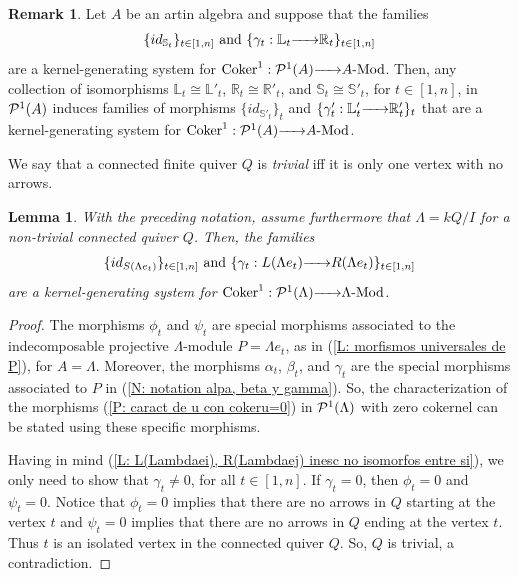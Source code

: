 \documentclass{article}
\newtheorem{lemma}[theorem]{Lemma}
\theoremstyle{definition}
\newtheorem{remark}[theorem]{Remark}
\newcommand{\Coker}{{ \rm Coker }}
\newcommand{\Mod}{{ \rm Mod }}
\newcommand{\g}{\hbox{-}}
\newcommand{\hueca}[1]{\mathbb{#1}}
\newcommand{\rightmap}[1]{\smash{\mathop{\hbox to 
20pt{\rightarrowfill}}\limits^{#1}}}
\begin{document}
\begin{remark}\label{R: isomorfos a generadores son generadores} 
Let $A$ be an artin algebra and 
suppose that  the families  
$$
\{id_{\hueca{S}_t}\}_{t\in [1,n]} \hbox{ and } 
\{\gamma_t:\hueca{L}_t\rightmap{}\hueca{R}_t\}_{t\in [1,n]}$$
  are a kernel-generating system for $\Coker^1:{\cal P}^1(A)\rightmap{}A\g\Mod$. 
 Then, any collection of isomorphisms  
$\hueca{L}_t\cong \hueca{L}'_t$, 
$\hueca{R}_t\cong \hueca{R}'_t$, and 
$\hueca{S}_t\cong \hueca{S}'_t$, for $t\in [1,n]$, in ${\cal P}^1(A)$ induces  families of  morphisms 
$\{id_{\hueca{S}'_t}\}_t$ and $\{\gamma'_t:\hueca{L}'_t\rightmap{}\hueca{R}'_t\}_t$ that are a kernel-generating system for  $\Coker^1:{\cal P}^1(A)\rightmap{}A\g\Mod$. 
\end{remark}

We say that a connected finite quiver $Q$ is \emph{trivial} iff it is only one vertex with no arrows. 

\begin{lemma}\label{R: vale Prop para las gammas(t)}  With the preceding notation, assume furthermore that $\Lambda=kQ/I$ for a  non-trivial connected quiver $Q$. Then, the families 
$$
\{id_{S(\Lambda e_t)}\}_{t\in [1,n]} \hbox{ and } 
\{\gamma_t:L(\Lambda e_t)\rightmap{}R(\Lambda e_t)\}_{t\in [1,n]}$$
 are a kernel-generating system for $\Coker^1:{\cal P}^1(\Lambda)\rightmap{}\Lambda\g\Mod$.
 \end{lemma}
 
\begin{proof}
 The morphisms $\phi_t$ and $\psi_t$ are special morphisms associated to the indecomposable projective $\Lambda$-module $P = \Lambda e_t$, as in (\ref{L: morfismos universales de P}), for $A=\Lambda$. Moreover, the morphisms $\alpha_t$, $\beta_t$, and $\gamma_t$ are the special morphisms associated to $P$ in (\ref{N: notation alpa, beta y gamma}). So, the characterization of the morphisms (\ref{P: caract de u con cokeru=0}) in ${\cal P}^1(\Lambda)$ with zero cokernel can be stated using these specific morphisms.

 Having in mind (\ref{L: L(Lambdaei), R(Lambdaej) inesc no isomorfos entre si}), we only need to show that $\gamma_t\not=0$, for all $t\in [1,n]$. If $\gamma_t=0$, then $\phi_t=0$ and $\psi_t=0$. Notice that $\phi_t=0$ implies that there are no arrows in $Q$ starting at the vertex $t$ and $\psi_t=0$ implies that there are no arrows in $Q$ ending at the vertex $t$. Thus $t$ is an isolated vertex in the connected quiver $Q$. So, 
 $Q$ is trivial,  a contradiction.  
\end{proof} 
\end{document}
